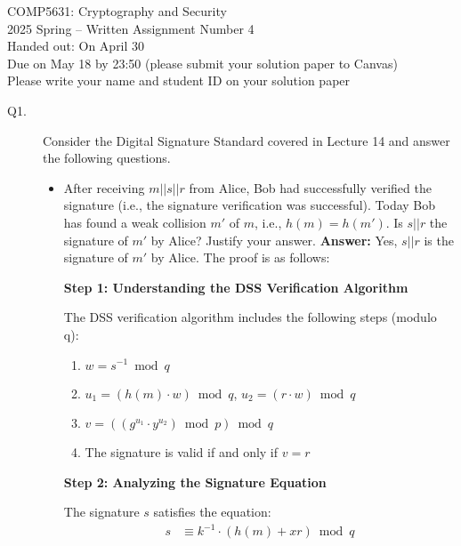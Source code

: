 \documentclass[11pt]{article}
\begin{document}
\newcommand{\lsp}[1]{\large\renewcommand{\baselinestretch}{#1}\normalsize}
\lsp{1}
{\sf 
\begin{center}
COMP5631: Cryptography and Security \\
2025 Spring -- Written Assignment Number 4  \\
Handed out: On April 30 \\ 
Due on May 18 by 23:50 (please submit your solution paper to Canvas)  \\ 
Please write your name and student ID on your solution paper 
\end{center}
}

\thispagestyle{empty} \pagestyle{empty}


\begin{description}

\item[Q1.] 
Consider the Digital Signature Standard covered in Lecture 14 and answer the following questions. 
\begin{itemize}
\item After receiving $m||s||r$ from Alice,  Bob had successfully verified the signature (i.e., 
the signature verification was successful). 
Today Bob has found a weak collision $m'$ of $m$, i.e., $h(m)=h(m')$.  Is $s||r$ the signature of $m'$ by Alice? 
Justify your answer.  
\hfill {}
\textbf{Answer:} Yes, $s||r$ is the signature of $m'$ by Alice. The proof is as follows:

\vspace{0.2cm}
\noindent \textbf{Step 1: Understanding the DSS Verification Algorithm}

The DSS verification algorithm includes the following steps (modulo q):
\begin{enumerate}
    \item $w = s^{-1} \bmod q$
    \item $u_1 = (h(m) \cdot w) \bmod q$, $u_2 = (r \cdot w) \bmod q$
    \item $v = ((g^{u_1} \cdot y^{u_2}) \bmod p) \bmod q$
    \item The signature is valid if and only if $v = r$
\end{enumerate}

\vspace{0.2cm}
\noindent \textbf{Step 2: Analyzing the Signature Equation}

The signature $s$ satisfies the equation:
\begin{align}
s &\equiv k^{-1} \cdot (h(m) + xr) \bmod q
\end{align}


\end{itemize}
\end{description}
\end{document}
